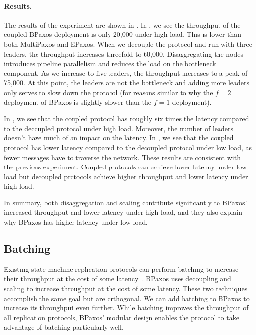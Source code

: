 \paragraph{Results.}
The results of the experiment are shown in . In
, we see the throughput of the coupled
BPaxos deployment is only 20,000 under high load. This is lower than both
MultiPaxos and EPaxos. When we decouple the protocol and run with three
leaders, the throughput increases threefold to 60,000. Disaggregating the nodes
introduces pipeline parallelism and reduces the load on the bottleneck
component. As we increase to five leaders, the throughput increases to a peak
of 75,000. At this point, the leaders are not the bottleneck and adding more
leaders only serves to slow down the protocol (for reasons similar to why the
$f=2$ deployment of BPaxos is slightly slower than the $f=1$ deployment).

In , we see that the coupled protocol has
roughly six times the latency compared to the decoupled protocol under high
load. Moreover, the number of leaders doesn't have much of an impact on the
latency. In , we see that the coupled
protocol has lower latency compared to the decoupled protocol under low load,
as fewer messages have to traverse the network. These results are consistent
with the previous experiment. Coupled protocols can achieve lower latency under
low load but decoupled protocols achieve higher throughput and lower latency
under high load.

In summary, both disaggregation and scaling contribute significantly to BPaxos'
increased throughput and lower latency under high load, and they also explain
why BPaxos has higher latency under low load.

%
%
\subsection{Batching}
Existing state machine replication protocols can perform batching to increase
their throughput at the cost of some latency~\cite{santos2012tuning,
santos2013optimizing, moraru2013proof}. BPaxos uses decoupling and scaling to
increase throughput at the cost of some latency. These two techniques
accomplish the same goal but are orthogonal. We can add batching to BPaxos to
increase its throughput even further. While batching improves the throughput of
all replication protocols, BPaxos' modular design enables the protocol to take
advantage of batching particularly well.

